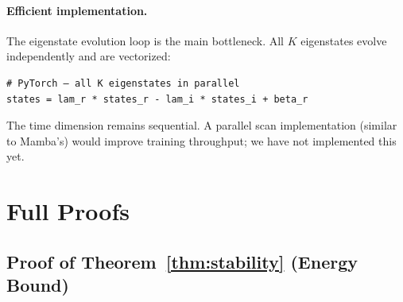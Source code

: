 \documentclass{article}
\begin{document}
\paragraph{Efficient implementation.}
The eigenstate evolution loop is the main bottleneck. All $K$ eigenstates evolve independently and are vectorized:
\begin{verbatim}
# PyTorch — all K eigenstates in parallel
states = lam_r * states_r - lam_i * states_i + beta_r
\end{verbatim}
The time dimension remains sequential. A parallel scan implementation (similar to Mamba's) would improve training throughput; we have not implemented this yet.


\section{Full Proofs}
\label{app:proofs}

\subsection{Proof of Theorem~\ref{thm:stability} (Energy Bound)}
\end{document}
